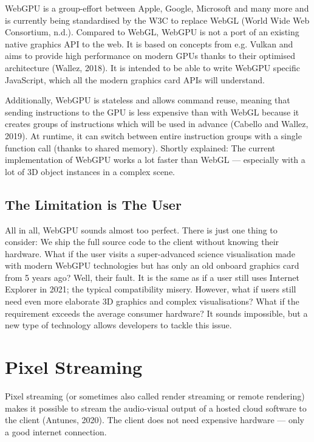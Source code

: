 \documentclass[10pt]{article}
\begin{document}
\begin{sloppypar}
  WebGPU is a group-effort between Apple, Google, Microsoft and many more and is currently being standardised by the W3C to replace WebGL (World Wide Web Consortium, n.d.). Compared to WebGL, WebGPU is not a port of an existing native graphics API to the web. It is based on concepts from e.g. Vulkan and aims to provide high performance on modern GPUs thanks to their optimised architecture (Wallez, 2018). It is intended to be able to write WebGPU specific JavaScript, which all the modern graphics card APIs will understand.

  Additionally, WebGPU is stateless and allows command reuse, meaning that sending instructions to the GPU is less expensive than with WebGL because it creates groups of instructions which will be used in advance (Cabello and Wallez, 2019). At runtime, it can switch between entire instruction groups with a single function call (thanks to shared memory). Shortly explained: The current implementation of WebGPU works a lot faster than WebGL — especially with a lot of 3D object instances in a complex scene.

  \subsection{The Limitation is The User}
  \label{subsec:the-limitation-is-the-user}

  All in all, WebGPU sounds almost too perfect. There is just one thing to consider: We ship the full source code to the client without knowing their hardware. What if the user visits a super-advanced science visualisation made with modern WebGPU technologies but has only an old onboard graphics card from 5 years ago? Well, their fault. It is the same as if a user still uses Internet Explorer in 2021; the typical compatibility misery. However, what if users still need even more elaborate 3D graphics and complex visualisations? What if the requirement exceeds the average consumer hardware? It sounds impossible, but a new type of technology allows developers to tackle this issue.

  \section{Pixel Streaming}
  \label{sec:pixel-streaming}

  Pixel streaming (or sometimes also called render streaming or remote rendering) makes it possible to stream the audio-visual output of a hosted cloud software to the client (Antunes, 2020). The client does not need expensive hardware — only a good internet connection.


\end{sloppypar}
\end{document}
